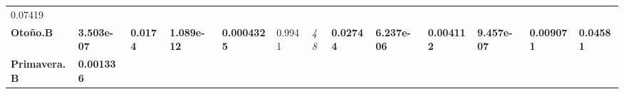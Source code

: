 \documentclass[]{book}
\theoremstyle{definition}
\theoremstyle{definition}
\theoremstyle{definition}
\theoremstyle{remark}
\begin{document}
\begin{longtable}[]{@{}lllllllllllll@{}}
\begin{minipage}[t]{0.05\columnwidth}
0.07419\strut
\end{minipage}\tabularnewline
\begin{minipage}[t]{0.06\columnwidth}\raggedright
\textbf{Otoño.B}\strut
\end{minipage} & \begin{minipage}[t]{0.05\columnwidth}\raggedright
\textbf{3.503e-07}\strut
\end{minipage} & \begin{minipage}[t]{0.05\columnwidth}\raggedright
\textbf{0.0174}\strut
\end{minipage} & \begin{minipage}[t]{0.06\columnwidth}\raggedright
\textbf{1.089e-12}\strut
\end{minipage} & \begin{minipage}[t]{0.05\columnwidth}\raggedright
\textbf{0.0004325}\strut
\end{minipage} & \begin{minipage}[t]{0.05\columnwidth}\raggedright
0.9941\strut
\end{minipage} & \begin{minipage}[t]{0.05\columnwidth}\raggedright
\emph{48}\strut
\end{minipage} & \begin{minipage}[t]{0.06\columnwidth}\raggedright
\textbf{0.02744}\strut
\end{minipage} & \begin{minipage}[t]{0.05\columnwidth}\raggedright
\textbf{6.237e-06}\strut
\end{minipage} & \begin{minipage}[t]{0.05\columnwidth}\raggedright
\textbf{0.004112}\strut
\end{minipage} & \begin{minipage}[t]{0.05\columnwidth}\raggedright
\textbf{9.457e-07}\strut
\end{minipage} & \begin{minipage}[t]{0.06\columnwidth}\raggedright
\textbf{0.009071}\strut
\end{minipage} & \begin{minipage}[t]{0.05\columnwidth}\raggedright
\textbf{0.04581}\strut
\end{minipage}\tabularnewline
\begin{minipage}[t]{0.06\columnwidth}\raggedright
\textbf{Primavera.B}\strut
\end{minipage} & \begin{minipage}[t]{0.05\columnwidth}\raggedright
\textbf{0.001336}\strut
\end{minipage} & \begin{minipage}[t]{0.05\columnwidth}\raggedright

\end{minipage}
\end{longtable}
\end{document}
